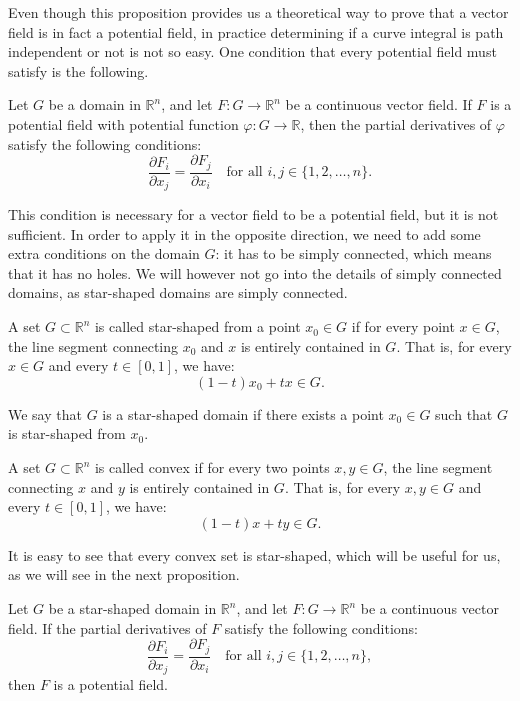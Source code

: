 Even though this proposition provides us a theoretical way to prove that a vector field is in fact a potential field, in practice determining if a curve integral is path independent or not is not so easy. One condition that every potential field must satisfy is the following.
\begin{prop}
    Let $G$ be a domain in $\mathbb{R}^n$, and let $F : G \to \mathbb{R}^n$ be a continuous vector field. If $F$ is a potential field with potential function $\varphi : G \to \mathbb{R}$, then the partial derivatives of $\varphi$ satisfy the following conditions:
    \[
        \frac{\partial F_i}{\partial x_j} = \frac{\partial F_j}{\partial x_i} \quad \text{for all } i, j \in \{1, 2, \dots, n\}.
    \]
\end{prop}
This condition is necessary for a vector field to be a potential field, but it is not sufficient. In order to apply it in the opposite direction, we need to add some extra conditions on the domain $G$: it has to be simply connected, which means that it has no holes. We will however not go into the details of simply connected domains, as star-shaped domains are simply connected.
\begin{definicion}
    A set $G\subset\mathbb{R}^n$ is called star-shaped from a point $x_0 \in G$ if for every point $x \in G$, the line segment connecting $x_0$ and $x$ is entirely contained in $G$. That is, for every $x \in G$ and every $t \in [0, 1]$, we have:
    \[
        (1 - t)x_0 + tx \in G.
    \]

    We say that $G$ is a star-shaped domain if there exists a point $x_0 \in G$ such that $G$ is star-shaped from $x_0$.
\end{definicion}
\begin{definicion}[Convex]
    A set $G\subset\mathbb{R}^n$ is called convex if for every two points $x, y \in G$, the line segment connecting $x$ and $y$ is entirely contained in $G$. That is, for every $x, y \in G$ and every $t \in [0, 1]$, we have:
    \[
        (1 - t)x + ty \in G.
    \]
\end{definicion}

It is easy to see that every convex set is star-shaped, which will be useful for us, as we will see in the next proposition.
\begin{prop}
    Let $G$ be a star-shaped domain in $\mathbb{R}^n$, and let $F : G \to \mathbb{R}^n$ be a continuous vector field. If the partial derivatives of $F$ satisfy the following conditions:
    \[
        \frac{\partial F_i}{\partial x_j} = \frac{\partial F_j}{\partial x_i} \quad \text{for all } i, j \in \{1, 2, \dots, n\},
    \]
    then $F$ is a potential field.
\end{prop}

